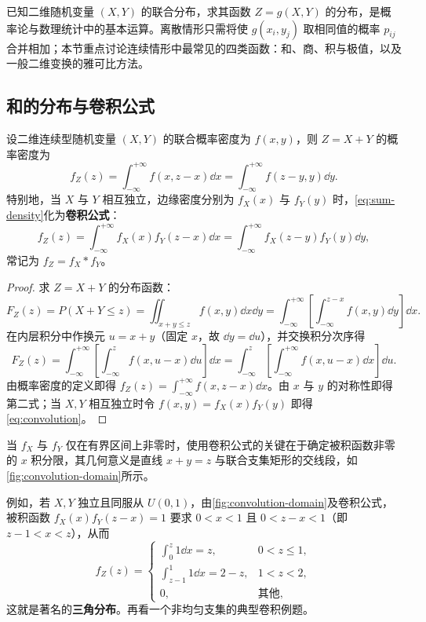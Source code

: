 已知二维随机变量 $(X,Y)$ 的联合分布，求其函数 $Z=g(X,Y)$ 的分布，是概率论与数理统计中的基本运算。离散情形只需将使 $g(x_i,y_j)$ 取相同值的概率 $p_{ij}$ 合并相加；本节重点讨论连续情形中最常见的四类函数：和、商、积与极值，以及一般二维变换的雅可比方法。

\subsection{和的分布与卷积公式}

\begin{theorem}[和的分布与卷积公式]
\label{thm:convolution}
设二维连续型随机变量 $(X,Y)$ 的联合概率密度为 $f(x,y)$，则 $Z=X+Y$ 的概率密度为
\begin{equation}
  f_Z(z)=\int_{-\infty}^{+\infty}f(x,z-x)\dd x
  =\int_{-\infty}^{+\infty}f(z-y,y)\dd y.
  \label{eq:sum-density}
\end{equation}
特别地，当 $X$ 与 $Y$ 相互独立，边缘密度分别为 $f_X(x)$ 与 $f_Y(y)$ 时，\eqref{eq:sum-density}化为\textbf{卷积公式}：
\begin{equation}
  f_Z(z)=\int_{-\infty}^{+\infty}f_X(x)f_Y(z-x)\dd x
  =\int_{-\infty}^{+\infty}f_X(z-y)f_Y(y)\dd y,
  \label{eq:convolution}
\end{equation}
常记为 $f_Z=f_X * f_Y$。
\end{theorem}
\begin{proof}
求 $Z=X+Y$ 的分布函数：
\[
  F_Z(z)=P(X+Y\le z)=\iint_{x+y\le z}f(x,y)\dd x\dd y
  =\int_{-\infty}^{+\infty}\left[\int_{-\infty}^{z-x}f(x,y)\dd y\right]\dd x.
\]
在内层积分中作换元 $u=x+y$（固定 $x$，故 $\dd y=\dd u$），并交换积分次序得
\[
  F_Z(z)=\int_{-\infty}^{+\infty}\left[\int_{-\infty}^{z}f(x,u-x)\dd u\right]\dd x
  =\int_{-\infty}^{z}\left[\int_{-\infty}^{+\infty}f(x,u-x)\dd x\right]\dd u.
\]
由概率密度的定义即得 $f_Z(z)=\int_{-\infty}^{+\infty}f(x,z-x)\dd x$。由 $x$ 与 $y$ 的对称性即得第二式；当 $X,Y$ 相互独立时令 $f(x,y)=f_X(x)f_Y(y)$ 即得\eqref{eq:convolution}。
\end{proof}

当 $f_X$ 与 $f_Y$ 仅在有界区间上非零时，使用卷积公式的关键在于确定被积函数非零的 $x$ 积分限，其几何意义是直线 $x+y=z$ 与联合支集矩形的交线段，如\cref{fig:convolution-domain}所示。


例如，若 $X,Y$ 独立且同服从 $U(0,1)$，由\cref{fig:convolution-domain}及卷积公式，被积函数 $f_X(x)f_Y(z-x)=1$ 要求 $0<x<1$ 且 $0<z-x<1$（即 $z-1<x<z$），从而
\[
  f_Z(z)=
  \begin{cases}
    \displaystyle\int_{0}^{z}1\dd x=z,& 0<z\le 1,\\[6pt]
    \displaystyle\int_{z-1}^{1}1\dd x=2-z,& 1<z<2,\\
    0,& \text{其他},
  \end{cases}
\]
这就是著名的\textbf{三角分布}。再看一个非均匀支集的典型卷积例题。

